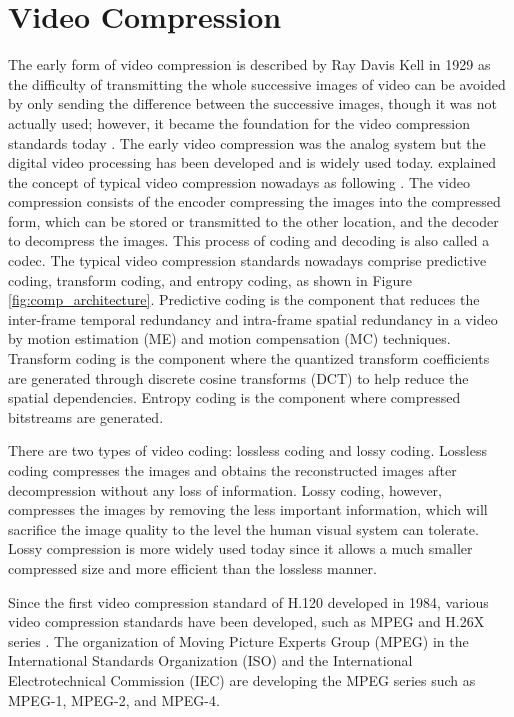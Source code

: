 \section{Video Compression}
\label{sec:introduction/section_b}

The early form of video compression is described by Ray Davis Kell in 1929 as the difficulty of transmitting the whole successive images of video can be avoided by only sending the difference between the successive images, though it was not actually used; however, it became the foundation for the video compression standards today \cite{jacobs_brief_2009}. The early video compression was the analog system but the digital video processing has been developed and is widely used today. \citeauthor{zhang_overview_2019} explained the concept of typical video compression nowadays as following \cite{zhang_overview_2019}. The video compression consists of the encoder compressing the images into the compressed form, which can be stored or transmitted to the other location, and the decoder to decompress the images. This process of coding and decoding is also called a codec. The typical video compression standards nowadays comprise predictive coding, transform coding, and entropy coding, as shown in Figure \ref{fig:comp_architecture}. Predictive coding is the component that reduces the inter-frame temporal redundancy and intra-frame spatial redundancy in a video by motion estimation (ME) and motion compensation (MC) techniques. Transform coding is the component where the quantized transform coefficients are generated through discrete cosine transforms (DCT) to help reduce the spatial dependencies. Entropy coding is the component where compressed bitstreams are generated.



There are two types of video coding: lossless coding and lossy coding. Lossless coding compresses the images and obtains the reconstructed images after decompression without any loss of information. Lossy coding, however, compresses the images by removing the less important information, which will sacrifice the image quality to the level the human visual system can tolerate. Lossy compression is more widely used today since it allows a much smaller compressed size and more efficient than the lossless manner.

Since the first video compression standard of H.120 developed in 1984, various video compression standards have been developed, such as MPEG and H.26X series \cite{zhang_overview_2019}. The organization of Moving Picture Experts Group (MPEG) in the International Standards Organization (ISO) and the International Electrotechnical Commission (IEC) are developing the MPEG series such as MPEG-1, MPEG-2, and MPEG-4.

